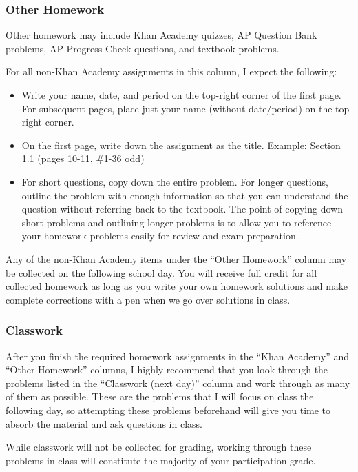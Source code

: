 \documentclass[12pt,fleqn]{article}
\begin{document}
\hypertarget{other-homework}{%
\subsubsection{Other Homework}\label{other-homework}}

Other homework may include Khan Academy quizzes, AP Question Bank problems, AP Progress Check questions, and textbook problems.

For all non-Khan Academy assignments in this column, I expect the following:

\begin{itemize}
\item
  Write your name, date, and period on the top-right corner of the first page. For subsequent pages, place just your name (without date/period) on the top-right corner.
\item
  On the first page, write down the assignment as the title. Example: Section 1.1 (pages 10-11, \#1-36 odd)
\item
  For short questions, copy down the entire problem. For longer questions, outline the problem with enough information so that you can understand the question without referring back to the textbook. The point of copying down short problems and outlining longer problems is to allow you to reference your homework problems easily for review and exam preparation.
\end{itemize}

Any of the non-Khan Academy items under the ``Other Homework'' column may be collected on the following school day. You will receive full credit for all collected homework as long as you write your own homework solutions and make complete corrections with a pen when we go over solutions in class.

\hypertarget{classwork}{%
\subsubsection{Classwork}\label{classwork}}

After you finish the required homework assignments in the ``Khan Academy'' and ``Other Homework'' columns, I highly recommend that you look through the problems listed in the ``Classwork (next day)'' column and work through as many of them as possible. These are the problems that I will focus on class the following day, so attempting these problems beforehand will give you time to absorb the material and ask questions in class.

While classwork will not be collected for grading, working through these problems in class will constitute the majority of your participation grade.
\end{document}
